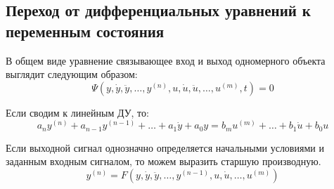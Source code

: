 \subsection{Переход от дифференциальных уравнений к переменным состояния}
В общем виде уравнение связывающее вход и выход одномерного объекта выглядит
следующим образом:
\[ \Psi(y, \dot y, \ddot y, \dots, y^{(n)}, u, \dot u, \ddot u, \dots, u^{(m)},
t) = 0 \]\par
Если сводим к линейным ДУ, то:
\[ a_n y^{(n)} + a_{n-1} y^{(n-1)} + \dots + a_1 \dot y + a_0 y = b_m u^{(m)} +
\dots + b_1 \dot u + b_0 u\]\par
Если выходной сигнал однозначно определяется начальными условиями и заданным
входным сигналом, то можем выразить старшую производную.
\begin{equation}
	y^{(n)} = F(y, \dot y, \ddot y, \dots, y^{(n-1)}, u, \dot u, \dots, u^{(m)})
	\label{eq}
\end{equation}

